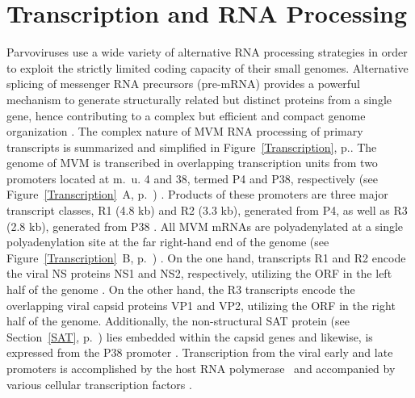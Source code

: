 

\section{Transcription and RNA Processing}
\label{Transcription1}
Parvoviruses use a wide variety of alternative RNA processing strategies in order to exploit the strictly limited coding capacity of their small genomes. Alternative splicing of messenger RNA precursors (pre-mRNA) provides a powerful mechanism to generate structurally related but distinct proteins from a single gene, hence contributing to a complex but efficient and compact genome organization \cite{pmid2694943, pmid1335742}. The complex nature of MVM RNA processing of primary transcripts is summarized and simplified in Figure~\ref{Transcription}, p.\pageref{Transcription}. The genome of MVM is transcribed in overlapping transcription units from two promoters located at m.~u. 4 and 38, termed P4 and P38, respectively (see Figure~\ref{Transcription}~A, p.~\pageref{Transcription}) \cite{pmid6828378}. Products of these promoters are three major transcript classes, R1 (4.8 kb) and R2 (3.3 kb), generated from P4, as well as R3 (2.8 kb), generated from P38 \cite{pmid3951017}. All MVM mRNAs are polyadenylated at a single polyadenylation site at the far right-hand end of the genome (see Figure~\ref{Transcription}~B, p.~\pageref{Transcription}) \cite{pmid3660591, pmid3502703}. On the one hand, transcripts R1 and R2 encode the viral NS proteins NS1 and NS2, respectively, utilizing the ORF in the left half of the genome \cite{pmid2939261}. On the other hand, the R3 transcripts encode the overlapping viral capsid proteins VP1 and VP2, utilizing the ORF in the right half of the genome. Additionally, the non-structural SAT protein (see Section~\ref{SAT}, p.~\pageref{SAT}) lies embedded within the capsid genes and likewise, is expressed from the P38 promoter \cite{pmid16189014}. Transcription from the viral early and late promoters is accomplished by the host RNA polymerase~ \cite{pmid6828378, polII} and accompanied by various cellular transcription factors \cite{pmid2585609, pmid8009857, pmid2325201, pmid7983715, pmid1942250}. 

